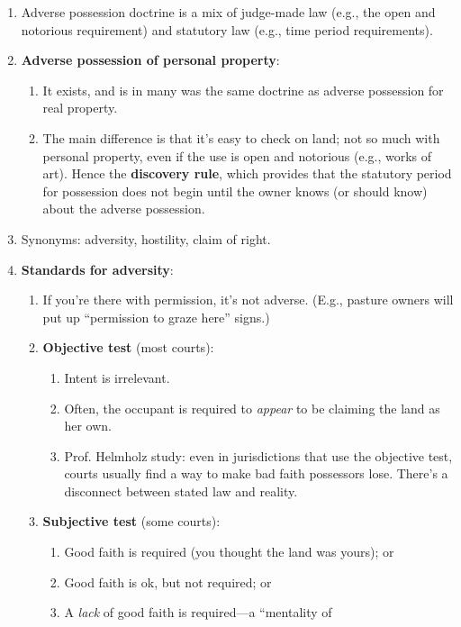 \begin{enumerate}
    \item Adverse possession doctrine is a mix of judge-made law (e.g., the open 
    and notorious requirement) and statutory law (e.g., time period 
    requirements).
    \item \textbf{Adverse possession of personal property}:
    \begin{enumerate}
        \item It exists, and is in many was the same doctrine as adverse 
        possession for real property.
        \item The main difference is that it's easy to check on 
        land; not so much with personal property, even if the use is open and 
        notorious (e.g., works of art). Hence the \textbf{discovery rule}, which 
        provides that the statutory period for possession does not begin until 
        the owner knows (or should know) about the adverse possession.
    \end{enumerate}
    \item Synonyms: adversity, hostility, claim of right.
    \item \textbf{Standards for adversity}:
    \begin{enumerate}
        \item If you're there with permission, it's not adverse. (E.g., 
        pasture owners will put up ``permission to graze here'' signs.)
        \item \textbf{Objective test} (most courts):
        \begin{enumerate}
            \item Intent is irrelevant.
            \item Often, the occupant is required to \emph{appear} to be 
            claiming the land as her own.
            \item Prof. Helmholz study: even in jurisdictions that use the 
            objective test, courts usually find a way to make bad faith 
            possessors lose. There's a disconnect between stated law and 
            reality.
        \end{enumerate}
        \item \textbf{Subjective test} (some courts):
        \begin{enumerate}
            \item Good faith is required (you thought the land was yours); or
            \item Good faith is ok, but not required; or
            \item A \emph{lack} of good faith is required---a ``mentality of 

\end{enumerate}
\end{enumerate}
\end{enumerate}
